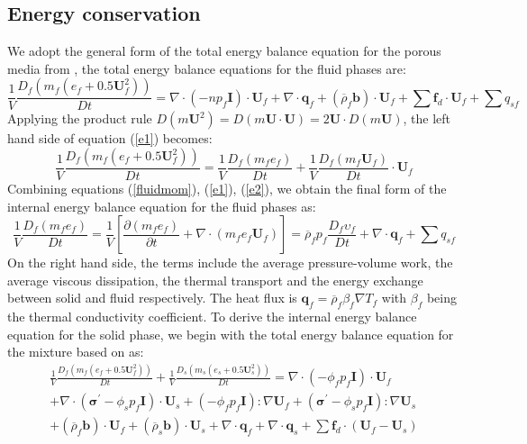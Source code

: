 \documentclass[preprint,12pt]{elsarticle}
\begin{document}
\subsection{\textsf{Energy conservation}}
We adopt the general form of the total energy balance equation for the porous media from \cite{Hassanizadeh}, the total energy balance equations for the fluid phases are:
%
%
\begin{equation}
\label{e1}
     \frac{1}{V}\frac{D_f(m_f (e_f+0.5\pmb{U}_f^2))}{Dt} = \nabla \cdot (-np_f\pmb{I}) \cdot \pmb{U}_f + \nabla \cdot \pmb{q}_f + (\overline{\rho}_f \pmb{b}) \cdot \pmb{U}_f +  \sum \pmb{f}_{d} \cdot \pmb{U}_f +  \sum q_{sf}
\end {equation}
%
%
Applying the product rule $D(m\pmb{U}^2)=D(m \pmb{U} \cdot \pmb{U}) = 2 \pmb{U} \cdot D(m \pmb{U})$, the left hand side of equation (\ref{e1}) becomes:\\
%
%
\begin{equation}
\label{e2}
     \frac{1}{V}\frac{D_f(m_f (e_f+0.5\pmb{U}_f^2))}{Dt}  = \frac{1}{V}\frac{D_f(m_f e_f)}{Dt} + \frac{1}{V}\frac{D_f(m_f \pmb{U}_f)}{Dt} \cdot \pmb{U}_f 
\end {equation}
%
%
Combining equations (\ref{fluidmom}), (\ref{e1}), (\ref{e2}), we obtain the final form of the internal energy balance equation for the fluid phases as:
%
%
\begin{equation}
     \frac{1}{V}\frac{D_f(m_f e_f)}{Dt} = \frac{1}{V} \left[ \frac{\partial (m_f e_f)}{\partial t} + \nabla \cdot  (m_f e_f \pmb{U}_f) \right] 
   = \overline{\rho}_f p_f  \frac{D_f\upsilon_f}{Dt} + \nabla \cdot \pmb{q}_f +  \sum q_{sf}
\end {equation}
%
%
On the right hand side, the terms include the average pressure-volume work, the average viscous dissipation, the thermal transport and the energy exchange between solid and fluid respectively. The heat flux is $\pmb{q}_f = \overline{\rho}_f \beta_f \nabla T_f$ with $\beta_f$ being the thermal conductivity coefficient. To derive the internal energy balance equation for the solid phase, we begin with the total energy balance equation for the mixture based on \cite{Hassanizadeh} as:\\
%
%
\begin{equation}
\label{e3}
\begin{gathered}
     \frac{1}{V}\frac{D_f(m_f (e_f+0.5\pmb{U}_f^2))}{Dt} + \frac{1}{V}\frac{D_s(m_s (e_s+0.5\pmb{U}_s^2))}{Dt} = \nabla \cdot (-\phi_f p_f\pmb{I}) \cdot \pmb{U}_f \\
     + \nabla \cdot (\pmb{\sigma}^\prime-\phi_s p_f\pmb{I}) \cdot \pmb{U}_s + (-\phi_f p_f\pmb{I}) : \nabla \pmb{U}_f + (\pmb{\sigma}^\prime-\phi_s p_f\pmb{I}) : \nabla \pmb{U}_s \\
     + (\overline{\rho}_f \pmb{b}) \cdot \pmb{U}_f + (\overline{\rho}_s \pmb{b}) \cdot \pmb{U}_s
     + \nabla \cdot \pmb{q}_f + \nabla \cdot \pmb{q}_s +  \sum \pmb{f}_{d} \cdot (\pmb{U}_f - \pmb{U}_s)  
\end {gathered}
\end {equation}
\end{document}
